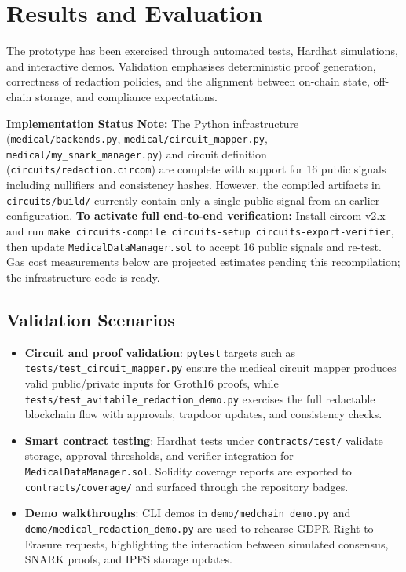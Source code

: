 \section{Results and Evaluation}

The prototype has been exercised through automated tests, Hardhat simulations, and interactive demos. Validation emphasises deterministic proof generation, correctness of redaction policies, and the alignment between on-chain state, off-chain storage, and compliance expectations.

\textbf{Implementation Status Note:} The Python infrastructure (\texttt{medical/backends.py}, \texttt{medical/circuit\_mapper.py}, \texttt{medical/my\_snark\_manager.py}) and circuit definition (\texttt{circuits/redaction.circom}) are complete with support for 16 public signals including nullifiers and consistency hashes. However, the compiled artifacts in \texttt{circuits/build/} currently contain only a single public signal from an earlier configuration. \textbf{To activate full end-to-end verification:} Install circom v2.x and run \texttt{make circuits-compile circuits-setup circuits-export-verifier}, then update \texttt{MedicalDataManager.sol} to accept 16 public signals and re-test. Gas cost measurements below are projected estimates pending this recompilation; the infrastructure code is ready.

\subsection{Validation Scenarios}
\begin{itemize}
    \item \textbf{Circuit and proof validation}: \texttt{pytest} targets such as \texttt{tests/test\_circuit\_mapper.py} ensure the medical circuit mapper produces valid public/private inputs for Groth16 proofs, while \texttt{tests/test\_avitabile\_redaction\_demo.py} exercises the full redactable blockchain flow with approvals, trapdoor updates, and consistency checks.
    \item \textbf{Smart contract testing}: Hardhat tests under \texttt{contracts/test/} validate storage, approval thresholds, and verifier integration for \texttt{MedicalDataManager.sol}. Solidity coverage reports are exported to \texttt{contracts/coverage/} and surfaced through the repository badges.
    \item \textbf{Demo walkthroughs}: CLI demos in \texttt{demo/medchain\_demo.py} and \texttt{demo/medical\_redaction\_demo.py} are used to rehearse GDPR Right-to-Erasure requests, highlighting the interaction between simulated consensus, SNARK proofs, and IPFS storage updates.
\end{itemize}

